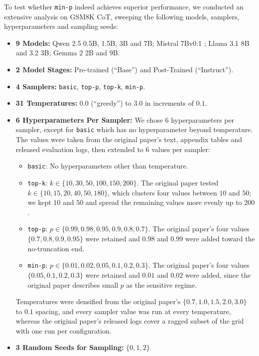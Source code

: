 To test whether \texttt{min-p} indeed achieves superior performance, we conducted an extensive analysis on GSM8K CoT, sweeping the following models, samplers, hyperparameters and sampling seeds:
%
\begin{itemize}
    \item \textbf{9 Models:} Qwen 2.5 \citep{qwen2025qwen25technicalreport} 0.5B, 1.5B, 3B and 7B; Mistral 7Bv0.1 \citep{jiang2023mistral7b}; Llama \citep{grattafiori2024llama3herdmodels} 3.1 8B and 3.2 3B; Gemma 2 \citep{gemmateam2024gemma2improvingopen} 2B and 9B.
    \item \textbf{2 Model Stages:} Pre-trained (``Base'') and Post-Trained (``Instruct'').
    \item \textbf{4 Samplers:} \texttt{basic}, \texttt{top-p}, \texttt{top-k}, \texttt{min-p}.
    \item \textbf{31 Temperatures:} $0.0$ (``greedy'') to $3.0$ in increments of $0.1$.
    \item \textbf{6 Hyperparameters Per Sampler:} We chose $6$ hyperparameters per sampler, except for \texttt{basic} which has no hyperparameter beyond temperature. The values were taken from the original paper's text, appendix tables and released evaluation logs, then extended to $6$ values per sampler:
    \begin{itemize}
        \item \texttt{basic}: No hyperparameters other than temperature.
        \item \texttt{top-k}:  $k \in \{10, 30, 50, 100, 150, 200 \}$. The original paper tested $k \in \{10, 15, 20, 40, 50, 180\}$, which clusters four values between $10$ and $50$; we kept $10$ and $50$ and spread the remaining values more evenly up to $200$.
        \item \texttt{top-p}: $p \in \{0.99, 0.98, 0.95, 0.9, 0.8, 0.7 \}$. The original paper's four values $\{0.7, 0.8, 0.9, 0.95\}$ were retained and $0.98$ and $0.99$ were added toward the no-truncation end.
        \item \texttt{min-p}: $p \in \{0.01, 0.02, 0.05, 0.1, 0.2, 0.3 \}$. The original paper's four values $\{0.05, 0.1, 0.2, 0.3\}$ were retained and $0.01$ and $0.02$ were added, since the original paper describes small $p$ as the sensitive regime.
    \end{itemize}
    Temperatures were densified from the original paper's $\{0.7, 1.0, 1.5, 2.0, 3.0\}$ to $0.1$ spacing, and every sampler value was run at every temperature, whereas the original paper's released logs cover a ragged subset of the grid with one run per configuration.
    \item \textbf{3 Random Seeds for Sampling:} $\{0, 1, 2\}$
\end{itemize}



